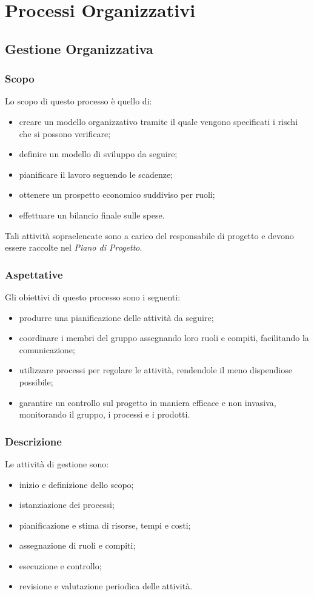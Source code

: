 \section{Processi Organizzativi}
	\subsection{Gestione Organizzativa}
		
		
		\subsubsection{Scopo}
		Lo scopo di questo processo è quello di:
		\begin{itemize}
			\item creare un modello organizzativo tramite il quale vengono specificati i rischi che si possono verificare;
			\item definire un modello di sviluppo da seguire;
			\item pianificare il lavoro seguendo le scadenze;
			\item ottenere un prospetto economico suddiviso per ruoli;
			\item effettuare un bilancio finale sulle spese.
		\end{itemize}
		Tali attività sopraelencate sono a carico del responsabile di progetto e devono essere raccolte nel \textit{Piano di Progetto}.
		
		\subsubsection{Aspettative}
		Gli obiettivi di questo processo sono i seguenti:
		\begin{itemize}
			\item produrre una pianificazione delle attività da seguire;
			\item coordinare i membri del gruppo assegnando loro ruoli e compiti, facilitando la comunicazione;
			\item utilizzare processi per regolare le attività, rendendole il meno dispendiose possibile;
			\item garantire un controllo sul progetto in maniera efficace e non invasiva, monitorando il gruppo, i processi e i prodotti.
		\end{itemize}
	
		\subsubsection{Descrizione}
		Le attività di gestione sono:
		\begin{itemize}
			\item inizio e definizione dello scopo;
			\item istanziazione dei processi;
			\item pianificazione e stima di risorse, tempi e costi;
			\item assegnazione di ruoli e compiti;
			\item esecuzione e controllo;
			\item revisione e valutazione periodica delle attività.
		\end{itemize}
		
